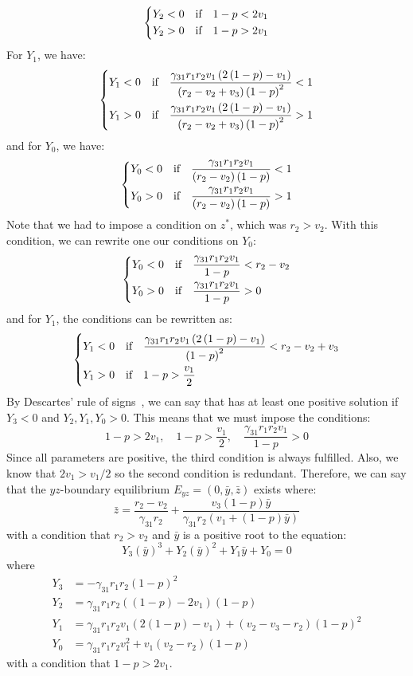 \[
\begin{dcases}
    Y_2<0 &\text{if}\quad 1-p<2v_1\\
    Y_2>0 &\text{if}\quad 1-p>2v_1
\end{dcases}
\]
For $Y_1$, we have:
\[
\begin{dcases}
    Y_1<0 &\text{if}\quad \frac{\gamma_{31}r_1r_2v_1\left(2\left(1-p\right)-v_1\right)}{\left(r_2-v_2+v_3\right)\left(1-p\right)^2}<1\\
    Y_1>0 &\text{if}\quad \frac{\gamma_{31}r_1r_2v_1\left(2\left(1-p\right)-v_1\right)}{\left(r_2-v_2+v_3\right)\left(1-p\right)^2}>1
\end{dcases}
\]
and for $Y_0$, we have:
\[
\begin{dcases}
    Y_0<0 &\text{if}\quad \frac{\gamma_{31}r_1r_2v_1}{\left(r_2-v_2\right)\left(1-p\right)}<1\\
    Y_0>0 &\text{if}\quad \frac{\gamma_{31}r_1r_2v_1}{\left(r_2-v_2\right)\left(1-p\right)}>1
\end{dcases}
\]
Note that we had to impose a condition on $z^*$, which was $r_2>v_2$. With this condition, we can rewrite one our conditions on $Y_0$:
\[
\begin{dcases}
    Y_0<0 &\text{if}\quad \frac{\gamma_{31}r_1r_2v_1}{1-p}<r_2-v_2\\
    Y_0>0 &\text{if}\quad \frac{\gamma_{31}r_1r_2v_1}{1-p}>0
\end{dcases}
\]
and for $Y_1$, the conditions can be rewritten as:
\[
\begin{dcases}
    Y_1<0 &\text{if}\quad \frac{\gamma_{31}r_1r_2v_1\left(2\left(1-p\right)-v_1\right)}{\left(1-p\right)^2}<r_2-v_2+v_3\\
    Y_1>0 &\text{if}\quad 1-p>\frac{v_1}2
\end{dcases}
\]
By Descartes' rule of signs~\cite{10.2307/1967494}, we can say that  has at least one positive solution if $Y_3<0$ and $Y_2,Y_1,Y_0>0$. This means that we must impose the conditions:
\[
1-p>2v_1,\quad 1-p>\frac{v_1}2,\quad \frac{\gamma_{31}r_1r_2v_1}{1-p}>0
\]
Since all parameters are positive, the third condition is always fulfilled. Also, we know that $2v_1>v_1/2$ so the second condition is redundant. Therefore, we can say that the $yz$-boundary equilibrium $E_{yz}=\left(0,\bar{y},\bar{z}\right)$ exists where:
\[
\bar{z}=\frac{r_2-v_2}{\gamma_{31}r_2}+\frac{v_3\left(1-p\right)\bar{y}}{\gamma_{31}r_2\left(v_1+\left(1-p\right)\bar{y}\right)}
\]
with a condition that $r_2>v_2$ and $\bar{y}$ is a positive root to the equation:
\begin{equation*}
    Y_3\left(\bar{y}\right)^3+Y_2\left(\bar{y}\right)^2+Y_1\bar{y}+Y_0=0
\end{equation*}
where
\begin{align*}
    Y_3 &= -\gamma_{31}r_1r_2\left(1-p\right)^2\\
    Y_2 &= \gamma_{31}r_1r_2\left(\left(1-p\right)-2v_1\right)\left(1-p\right)\\
    Y_1 &= \gamma_{31}r_1r_2v_1\left(2\left(1-p\right)-v_1\right)+\left(v_2-v_3-r_2\right)\left(1-p\right)^2\\
    Y_0 &= \gamma_{31}r_1r_2v_1^2+v_1\left(v_2-r_2\right)\left(1-p\right)
\end{align*}
with a condition that $1-p>2v_1$.

